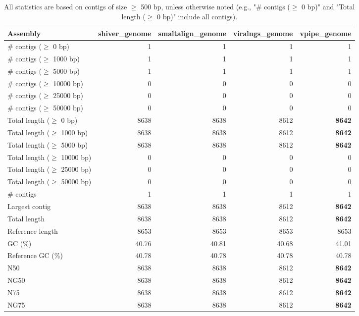 \documentclass[12pt,a4paper]{article}
\begin{document}
\begin{table}[ht]
\begin{center}
\caption{All statistics are based on contigs of size $\geq$ 500 bp, unless otherwise noted (e.g., "\# contigs ($\geq$ 0 bp)" and "Total length ($\geq$ 0 bp)" include all contigs).}
\begin{tabular}{|l*{4}{|r}|}
\hline
Assembly & shiver\_genome & smaltalign\_genome & viralngs\_genome & vpipe\_genome \\ \hline
\# contigs ($\geq$ 0 bp) & 1 & 1 & 1 & 1 \\ \hline
\# contigs ($\geq$ 1000 bp) & 1 & 1 & 1 & 1 \\ \hline
\# contigs ($\geq$ 5000 bp) & 1 & 1 & 1 & 1 \\ \hline
\# contigs ($\geq$ 10000 bp) & 0 & 0 & 0 & 0 \\ \hline
\# contigs ($\geq$ 25000 bp) & 0 & 0 & 0 & 0 \\ \hline
\# contigs ($\geq$ 50000 bp) & 0 & 0 & 0 & 0 \\ \hline
Total length ($\geq$ 0 bp) & 8638 & 8638 & 8612 & {\bf 8642} \\ \hline
Total length ($\geq$ 1000 bp) & 8638 & 8638 & 8612 & {\bf 8642} \\ \hline
Total length ($\geq$ 5000 bp) & 8638 & 8638 & 8612 & {\bf 8642} \\ \hline
Total length ($\geq$ 10000 bp) & 0 & 0 & 0 & 0 \\ \hline
Total length ($\geq$ 25000 bp) & 0 & 0 & 0 & 0 \\ \hline
Total length ($\geq$ 50000 bp) & 0 & 0 & 0 & 0 \\ \hline
\# contigs & 1 & 1 & 1 & 1 \\ \hline
Largest contig & 8638 & 8638 & 8612 & {\bf 8642} \\ \hline
Total length & 8638 & 8638 & 8612 & {\bf 8642} \\ \hline
Reference length & 8653 & 8653 & 8653 & 8653 \\ \hline
GC (\%) & 40.76 & 40.81 & 40.68 & 41.01 \\ \hline
Reference GC (\%) & 40.78 & 40.78 & 40.78 & 40.78 \\ \hline
N50 & 8638 & 8638 & 8612 & {\bf 8642} \\ \hline
NG50 & 8638 & 8638 & 8612 & {\bf 8642} \\ \hline
N75 & 8638 & 8638 & 8612 & {\bf 8642} \\ \hline
NG75 & 8638 & 8638 & 8612 & {\bf 8642} \\ \hline

\end{tabular}
\end{center}
\end{table}
\end{document}
